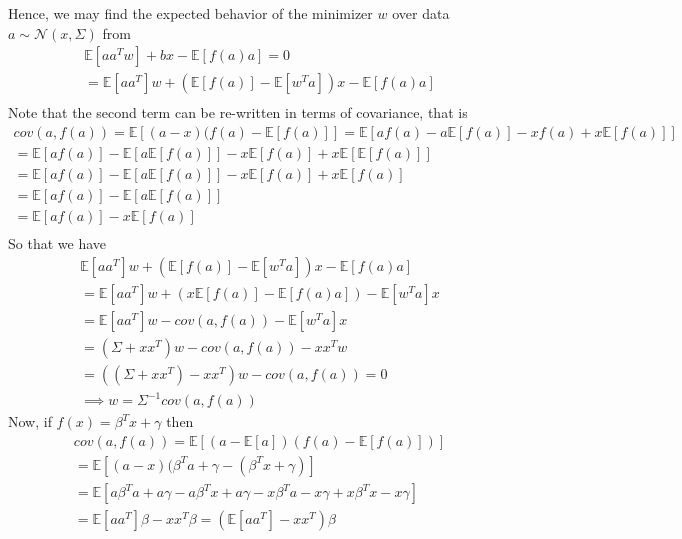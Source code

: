         Hence, we may find the expected behavior of the minimizer $w$ over data $a\sim \mathcal{N}(x,\Sigma)$ from
        \begin{gather}
            \mathds{E}[aa^Tw] + bx - \mathds{E}[f(a)a] = 0 \\
            = \mathds{E}[aa^T]w + (\mathds{E}[f(a)] - \mathbb{E}[w^Ta])x - \mathds{E}[f(a)a] \\
        \end{gather}
        Note that the second term can be re-written in terms of covariance, that is
        \begin{gather}
            cov(a,f(a))=\mathds{E}[(a-x)(f(a)-\mathds{E}[f(a)]]=\mathds{E}[af(a) - a\mathds{E}[f(a)] - xf(a) + x\mathds{E}[f(a)]] \\
            = \mathds{E}[af(a)] - \mathds{E}[a\mathds{E}[f(a)]] - x\mathds{E}[f(a)] + x\mathds{E}[\mathds{E}[f(a)]] \\
            = \mathds{E}[af(a)] - \mathds{E}[a\mathds{E}[f(a)]] - x\mathds{E}[f(a)] + x\mathds{E}[f(a)] \\
            = \mathds{E}[af(a)] - \mathds{E}[a\mathds{E}[f(a)]] \\
            = \mathds{E}[af(a)] - x\mathds{E}[f(a)] \\ %
         \end{gather}
         So that we have 
         \begin{gather}
            \mathds{E}[aa^T]w + (\mathds{E}[f(a)] - \mathbb{E}[w^Ta])x - \mathds{E}[f(a)a] \\
            = \mathds{E}[aa^T]w + (x\mathds{E}[f(a)] - \mathds{E}[f(a)a]) - \mathbb{E}[w^Ta]x  \\
            = \mathds{E}[aa^T]w - cov(a,f(a)) - \mathbb{E}[w^Ta]x  \\
            = (\Sigma + xx^T)w - cov(a,f(a)) - xx^Tw \\
            = ((\Sigma + xx^T) - xx^T)w - cov(a,f(a)) = 0 \\
            \implies w = \Sigma^{-1}cov(a,f(a))
         \end{gather}
         Now, if $f(x)=\beta^Tx + \gamma$ then 
         \begin{gather}
            cov(a,f(a)) = \mathds{E}[(a-\mathds{E}[a])(f(a)-\mathds{E}[f(a)])] \\
            = \mathds{E}[(a-x)(\beta^Ta + \gamma - (\beta^Tx + \gamma)] \\
            = \mathds{E}[a\beta^Ta + a\gamma - a\beta^Tx + a\gamma - x\beta^T a - x\gamma + x\beta^Tx - x\gamma] \\
            = \mathds{E}[aa^T]\beta - xx^T \beta = (\mathds{E}[aa^T]-xx^T)\beta\\
        \end{gather}
